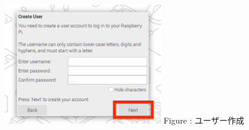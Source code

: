 \documentclass[a4paper,12pt]{jarticle}
\begin{document}
\begin{enumerate}
\begin{itemize}
        
            \begin{figure}[h]
              \centering
              \begin{minipage}{5.228cm}
                {\upshape
                  \includegraphics[width=7.000cm]{sw_image03.png}
                  \newline
                  Figure {\theFigure\label{seq:refFigure11}}:
                  ユーザー作成}
              \end{minipage}
            \end{figure}
          \end{itemize}


\end{enumerate}
\end{document}
